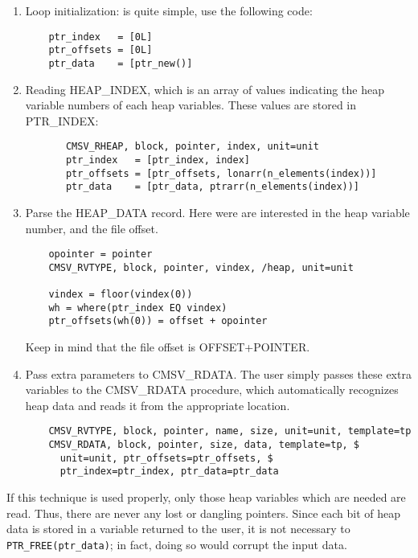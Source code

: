 \documentclass[12pt]{article}
\begin{document}
\begin{enumerate}
\item Loop initialization: is quite simple, use the following code:
\begin{verbatim}
    ptr_index   = [0L]
    ptr_offsets = [0L]
    ptr_data    = [ptr_new()]
\end{verbatim}

\item Reading HEAP\_INDEX, which is an array of values indicating
    the heap variable numbers of each heap variables.  These
    values are stored in PTR\_INDEX:

\begin{verbatim}
       CMSV_RHEAP, block, pointer, index, unit=unit
       ptr_index   = [ptr_index, index]
       ptr_offsets = [ptr_offsets, lonarr(n_elements(index))]
       ptr_data    = [ptr_data, ptrarr(n_elements(index))]
\end{verbatim}

\item Parse the HEAP\_DATA record.  Here were are interested in the
    heap variable number, and the file offset.

\begin{verbatim}    
    opointer = pointer
    CMSV_RVTYPE, block, pointer, vindex, /heap, unit=unit
    
    vindex = floor(vindex(0))
    wh = where(ptr_index EQ vindex)
    ptr_offsets(wh(0)) = offset + opointer
\end{verbatim}

    Keep in mind that the file offset is OFFSET+POINTER.

\item Pass extra parameters to CMSV\_RDATA.  The user simply passes
    these extra variables to the CMSV\_RDATA procedure, which
    automatically recognizes heap data and reads it from the
    appropriate location.

\begin{verbatim}
    CMSV_RVTYPE, block, pointer, name, size, unit=unit, template=tp
    CMSV_RDATA, block, pointer, size, data, template=tp, $
      unit=unit, ptr_offsets=ptr_offsets, $
      ptr_index=ptr_index, ptr_data=ptr_data
\end{verbatim}
\end{enumerate}

If this technique is used properly, only those heap variables
which are needed are read.  Thus, there are never any lost or
dangling pointers.  Since each bit of heap data is stored in a
variable returned to the user, it is not necessary to
\verb|PTR_FREE(ptr_data)|; in fact, doing so would corrupt the input
data.
\end{document}
